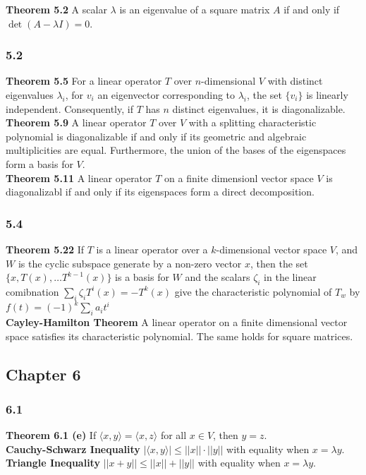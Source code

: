 \documentclass{article}
\begin{document}
\textbf{Theorem 5.2} 
A scalar $\lambda$ is an eigenvalue of a square matrix $A$ if and only if $\det(A-\lambda I) = 0$. \\

\subsubsection*{5.2}

\textbf{Theorem 5.5}
For a linear operator $T$ over $n$-dimensional $V$ with distinct eigenvalues $\lambda_i$,  for $v_i$ an eigenvector corresponding to $\lambda_i$, the set $\{v_i\}$ is linearly independent. Consequently, if $T$ has $n$ distinct eigenvalues, it is diagonalizable. \\
\textbf{Theorem 5.9}
A linear operator $T$ over $V$ with a splitting characteristic polynomial is diagonalizable if and only if its geometric and algebraic multiplicities are equal. Furthermore, the union of the bases of the eigenspaces form a basis for $V$. \\
\textbf{Theorem 5.11} A linear operator $T$ on a finite dimensionl vector space $V$ is diagonalizabl if and only if its eigenspaces form a direct decomposition.\\

\subsubsection*{5.4}
\textbf{Theorem 5.22} If $T$ is a linear operator over a $k$-dimensional vector space $V$, and $W$ is the cyclic subspace generate by a non-zero vector $x$, then the set $\{x, T(x), \ldots T^{k-1}(x)\}$ is a basis for $W$ and the scalars $\zeta_i$ in the linear comibnation $\sum_i \zeta_i T^i(x) = - T^k(x)$ give the characteristic polynomial of $T_w$ by $f(t) = (-1)^k \sum_i a_i t^i$ \\
\textbf{Cayley-Hamilton Theorem}
 A linear operator on a finite dimensional vector space satisfies its characteristic polynomial. The same holds for square matrices.\\ 
\subsection*{Chapter 6} 
\subsubsection*{6.1}
\textbf{Theorem 6.1 (e)} If $\langle x, y \rangle = \langle x, z \rangle $ for all $x \in V$, then $y = z$. \\
\textbf{Cauchy-Schwarz Inequality} $|\langle x, y \rangle| \leq ||x|| \cdot ||y||$ with equality when $x = \lambda y$. 
\textbf{Triangle Inequality} $||x+y||\leq ||x|| + ||y||$ with equality when $x = \lambda y$. 
\end{document}
